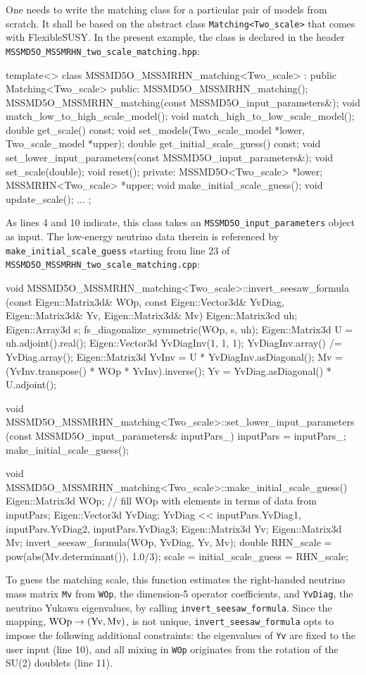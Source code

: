 \documentclass[final,3p,11pt,pdflatex]{elsarticle}
\makeatletter
\newcommand{\fs}{FlexibleSUSY\@\xspace}
\newcommand{\code}[1]{\lstinline|#1|}  %
\makeatother
\begin{document}
One needs to write the matching class for a particular pair of
models from scratch.
It shall be based on the abstract class \code{Matching<Two_scale>}
that comes with \fs.
In the present example, the class is declared in the header
\code{MSSMD5O_MSSMRHN_two_scale_matching.hpp}:
\begin{numlstlisting}
template<> class MSSMD5O_MSSMRHN_matching<Two_scale> : public Matching<Two_scale> {
public:
  MSSMD5O_MSSMRHN_matching();
  MSSMD5O_MSSMRHN_matching(const MSSMD5O_input_parameters&);
  void match_low_to_high_scale_model();
  void match_high_to_low_scale_model();
  double get_scale() const;
  void set_models(Two_scale_model *lower, Two_scale_model *upper);
  double get_initial_scale_guess() const;
  void set_lower_input_parameters(const MSSMD5O_input_parameters&);
  void set_scale(double);
  void reset();
private:
  MSSMD5O<Two_scale> *lower;
  MSSMRHN<Two_scale> *upper;
  void make_initial_scale_guess();
  void update_scale();
  ...
};
\end{numlstlisting}
As lines 4 and 10 indicate,
this class takes an \code{MSSMD5O_input_parameters} object as input.
The low-energy neutrino data therein is referenced by
\code{make_initial_scale_guess}
starting from line 23 of \code{MSSMD5O_MSSMRHN_two_scale_matching.cpp}:
\begin{numlstlisting}
void MSSMD5O_MSSMRHN_matching<Two_scale>::invert_seesaw_formula
(const Eigen::Matrix3d& WOp, const Eigen::Vector3d& YvDiag,
 Eigen::Matrix3d& Yv, Eigen::Matrix3d& Mv)
{
  Eigen::Matrix3cd uh;
  Eigen::Array3d s;
  fs_diagonalize_symmetric(WOp, s, uh);
  Eigen::Matrix3d U = uh.adjoint().real();
  Eigen::Vector3d YvDiagInv(1, 1, 1);
  YvDiagInv.array() /= YvDiag.array();
  Eigen::Matrix3d YvInv = U * YvDiagInv.asDiagonal();
  Mv = (YvInv.transpose() * WOp * YvInv).inverse();
  Yv = YvDiag.asDiagonal() * U.adjoint();
}

void MSSMD5O_MSSMRHN_matching<Two_scale>::set_lower_input_parameters
(const MSSMD5O_input_parameters& inputPars_)
{
  inputPars = inputPars_;
  make_initial_scale_guess();
}

void MSSMD5O_MSSMRHN_matching<Two_scale>::make_initial_scale_guess()
{
  Eigen::Matrix3d WOp;
  // fill WOp with elements in terms of data from inputPars;
  Eigen::Vector3d YvDiag;
  YvDiag << inputPars.YvDiag1, inputPars.YvDiag2, inputPars.YvDiag3;
  Eigen::Matrix3d Yv;
  Eigen::Matrix3d Mv;
  invert_seesaw_formula(WOp, YvDiag, Yv, Mv);
  double RHN_scale = pow(abs(Mv.determinant()), 1.0/3);
  scale = initial_scale_guess = RHN_scale;
}
\end{numlstlisting}
To guess the matching scale, this function estimates
the right-handed neutrino mass matrix \code{Mv}
from \code{WOp}, the dimension-5 operator coefficients,
and \code{YvDiag}, the neutrino Yukawa eigenvalues,
by calling \code{invert_seesaw_formula}.
Since the mapping,
$\mbox{\code{WOp}} \rightarrow (\mbox{\code{Yv}}, \mbox{\code{Mv}})$,
is not unique, \code{invert_seesaw_formula}
opts to impose the following additional constraints:
the eigenvalues of \code{Yv} are fixed to the user input (line 10),
and all mixing in \code{WOp} originates from the rotation of the SU(2)
doublets (line 11).
\end{document}
